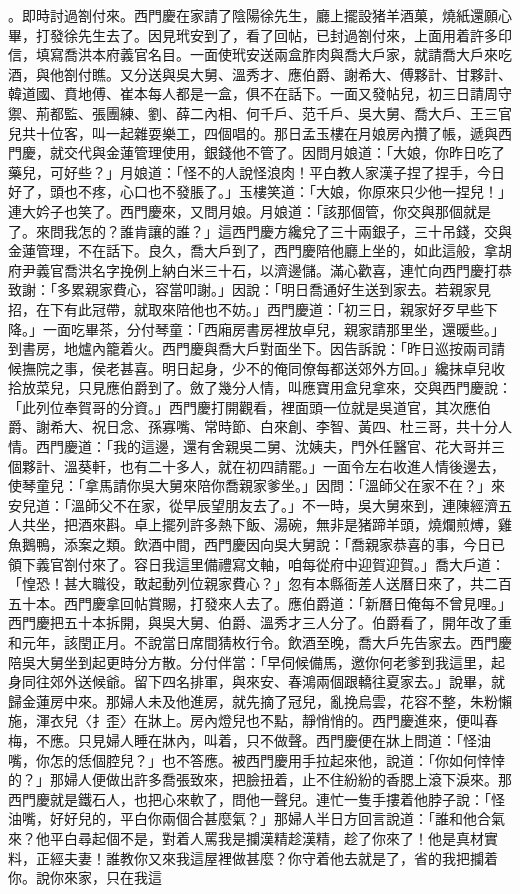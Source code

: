 \begin{showcontents}{}
。即時討過劄付來。西門慶在家請了陰陽徐先生，廳上擺設猪羊酒菓，燒紙還願心畢，打發徐先生去了。因見玳安到了，看了回帖，已封過劄付來，上面用着許多印信，填寫喬洪本府義官名目。一面使玳安送兩盒胙肉與喬大戶家，就請喬大戶來吃酒，與他劄付瞧。又分送與吳大舅、溫秀才、應伯爵、謝希大、傅夥計、甘夥計、韓道國、賁地傅、崔本每人都是一盒，俱不在話下。一面又發帖兒，初三日請周守禦、荊都監、張團練、劉、薛二內相、何千戶、范千戶、吳大舅、喬大戶、王三官兒共十位客，叫一起雜耍樂工，四個唱的。那日孟玉樓在月娘房內攢了帳，遞與西門慶，就交代與金蓮管理使用，銀錢他不管了。因問月娘道：「大娘，你昨日吃了藥兒，可好些？」月娘道：「怪不的人說怪浪肉！平白教人家漢子捏了捏手，今日好了，頭也不疼，心口也不發脹了。」玉樓笑道：「大娘，你原來只少他一捏兒！」連大妗子也笑了。西門慶來，又問月娘。月娘道：「該那個管，你交與那個就是了。來問我怎的？誰肯讓的誰？」這西門慶方纔兌了三十兩銀子，三十吊錢，交與金蓮管理，不在話下。良久，喬大戶到了，西門慶陪他廳上坐的，如此這般，拿胡府尹義官喬洪名字挽例上納白米三十石，以濟邊儲。滿心歡喜，連忙向西門慶打恭致謝：「多累親家費心，容當叩謝。」因說：「明日喬通好生送到家去。若親家見招，在下有此冠帶，就取來陪他也不妨。」西門慶道：「初三日，親家好歹早些下降。」一面吃畢茶，分付琴童：「西廂房書房裡放卓兒，親家請那里坐，還暖些。」到書房，地爐內籠着火。西門慶與喬大戶對面坐下。因告訴說：「昨日巡按兩司請候撫院之事，侯老甚喜。明日起身，少不的俺同僚每都送郊外方回。」纔抹卓兒收拾放菜兒，只見應伯爵到了。斂了幾分人情，叫應寶用盒兒拿來，交與西門慶說：「此列位奉賀哥的分資。」西門慶打開觀看，裡面頭一位就是吳道官，其次應伯爵、謝希大、祝日念、孫寡嘴、常時節、白來創、李智、黃四、杜三哥，共十分人情。西門慶道：「我的這邊，還有舍親吳二舅、沈姨夫，門外任醫官、花大哥并三個夥計、溫葵軒，也有二十多人，就在初四請罷。」一面令左右收進人情後邊去，使琴童兒：「拿馬請你吳大舅來陪你喬親家爹坐。」因問：「溫師父在家不在？」來安兒道：「溫師父不在家，從早辰望朋友去了。」不一時，吳大舅來到，連陳經濟五人共坐，把酒來斟。卓上擺列許多熱下飯、湯碗，無非是猪蹄羊頭，燒爛煎煿，雞魚鵝鴨，添案之類。飲酒中間，西門慶因向吳大舅說：「喬親家恭喜的事，今日已領下義官劄付來了。容日我這里備禮寫文軸，咱每從府中迎賀迎賀。」喬大戶道：「惶恐！甚大職役，敢起動列位親家費心？」忽有本縣衙差人送曆日來了，共二百五十本。西門慶拿回帖賞賜，打發來人去了。應伯爵道：「新曆日俺每不曾見哩。」西門慶把五十本拆開，與吳大舅、伯爵、溫秀才三人分了。伯爵看了，開年改了重和元年，該閏正月。不說當日席間猜枚行令。飲酒至晚，喬大戶先告家去。西門慶陪吳大舅坐到起更時分方散。分付伴當：「早伺候備馬，邀你何老爹到我這里，起身同往郊外送候爺。留下四名排軍，與來安、春鴻兩個跟轎往夏家去。」說畢，就歸金蓮房中來。那婦人未及他進房，就先摘了冠兒，亂挽烏雲，花容不整，朱粉懶施，渾衣兒〈扌歪〉在牀上。房內燈兒也不點，靜悄悄的。西門慶進來，便叫春梅，不應。只見婦人睡在牀內，叫着，只不做聲。西門慶便在牀上問道：「怪油嘴，你怎的恁個腔兒？」也不答應。被西門慶用手拉起來他，說道：「你如何悻悻的？」那婦人便做出許多喬張致來，把臉扭着，止不住紛紛的香腮上滾下淚來。那西門慶就是鐵石人，也把心來軟了，問他一聲兒。連忙一隻手摟着他脖子說：「怪油嘴，好好兒的，平白你兩個合甚麼氣？」那婦人半日方回言說道：「誰和他合氣來？他平白尋起個不是，對着人罵我是攔漢精趁漢精，趁了你來了！他是真材實料，正經夫妻！誰教你又來我這屋裡做甚麼？你守着他去就是了，省的我把攔着你。說你來家，只在我這
\end{showcontents}
